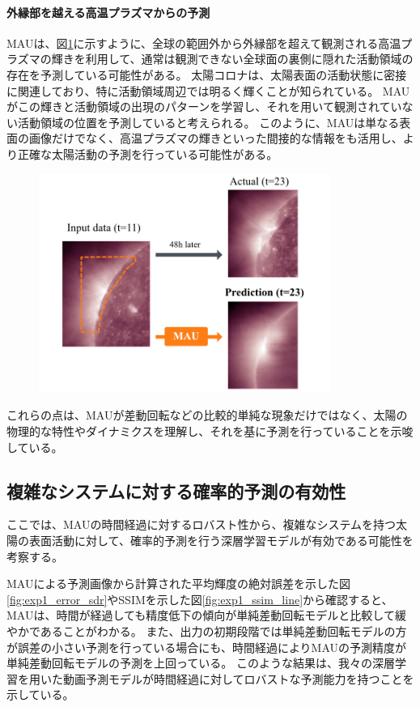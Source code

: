       \paragraph{外縁部を越える高温プラズマからの予測}
        MAUは、図\ref{fig:limb_prediction}に示すように、全球の範囲外から外縁部を超えて観測される高温プラズマの輝きを利用して、通常は観測できない全球面の裏側に隠れた活動領域の存在を予測している可能性がある。
        太陽コロナは、太陽表面の活動状態に密接に関連しており、特に活動領域周辺では明るく輝くことが知られている。
        MAUがこの輝きと活動領域の出現のパターンを学習し、それを用いて観測されていない活動領域の位置を予測していると考えられる。
        このように、MAUは単なる表面の画像だけでなく、高温プラズマの輝きといった間接的な情報をも活用し、より正確な太陽活動の予測を行っている可能性がある。
        \begin{figure}
          \centering
          \includegraphics[width=0.85\textwidth]{figures/exp1/limb_prediction.jpg}
          \caption{}
          \label{fig:limb_prediction}
        \end{figure}

      これらの点は、MAUが差動回転などの比較的単純な現象だけではなく、太陽の物理的な特性やダイナミクスを理解し、それを基に予測を行っていることを示唆している。
    
    \subsection{複雑なシステムに対する確率的予測の有効性}
      ここでは、MAUの時間経過に対するロバスト性から、複雑なシステムを持つ太陽の表面活動に対して、確率的予測を行う深層学習モデルが有効である可能性を考察する。

      MAUによる予測画像から計算された平均輝度の絶対誤差を示した図\ref{fig:exp1_error_sdr}やSSIMを示した図\ref{fig:exp1_ssim_line}から確認すると、MAUは、時間が経過しても精度低下の傾向が単純差動回転モデルと比較して緩やかであることがわかる。
      また、出力の初期段階では単純差動回転モデルの方が誤差の小さい予測を行っている場合にも、時間経過によりMAUの予測精度が単純差動回転モデルの予測を上回っている。
      このような結果は、我々の深層学習を用いた動画予測モデルが時間経過に対してロバストな予測能力を持つことを示している。

